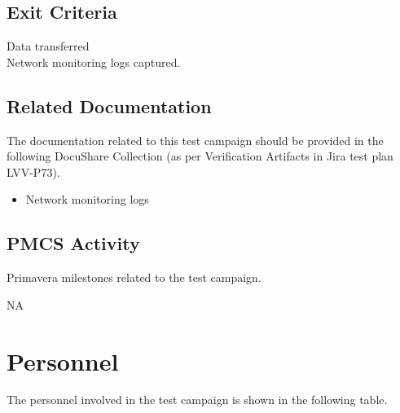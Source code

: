 \documentclass[DM,lsstdraft,STR,toc]{lsstdoc}
\begin{document}
  \subsection{Exit Criteria}
  Data transferred\\
Network monitoring logs captured.


\subsection{Related Documentation}

The documentation related to this test campaign should be provided in the following DocuShare Collection
(as per Verification Artifacts in Jira test plan LVV-P73).

\begin{itemize}
\item Network monitoring logs
\end{itemize}



\subsection{PMCS Activity}

Primavera milestones related to the test campaign.

NA


\newpage
\section{Personnel}
\label{sect:personnel}

The personnel involved in the test campaign is shown in the following table.
\end{document}

